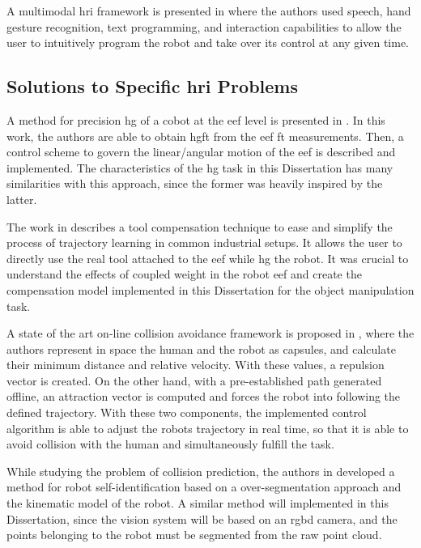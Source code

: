 \par A multimodal \ac{hri} framework is presented in \cite{colab.multimodal} where the authors used speech, hand gesture recognition, text programming, and interaction capabilities to allow the user to intuitively program the robot and take over its control at any given time. 

\subsection{Solutions to Specific \acs{hri} Problems}

\par A method for precision \ac{hg} of a cobot at the \ac{eef} level is presented in \cite{spec.handguide}. In this work, the authors are able to obtain \ac{hgft} from the \ac{eef} \ac{ft} measurements. Then, a control scheme to govern the linear/angular motion of the \ac{eef} is described and implemented. The characteristics of the \ac{hg} task in this Dissertation has many similarities with this approach, since the former was heavily inspired by the latter.

\par The work in \cite{spec.compensation} describes a tool compensation technique to ease and simplify the process of trajectory learning in common industrial setups. It allows the user to directly use the real tool attached to the \ac{eef} while \ac{hg} the robot. It was crucial to understand the effects of coupled weight in the robot \ac{eef} and create the compensation model implemented in this Dissertation for the object manipulation task.

\par A state of the art on-line collision avoidance framework is proposed in \cite{spec.collision}, where the authors represent in space the human and the robot as capsules, and calculate their minimum distance and relative velocity. With these values, a repulsion vector is created. On the other hand, with a pre-established path generated offline, an attraction vector is computed and forces the robot into following the defined trajectory. With these two components, the implemented control algorithm is able to adjust the robots trajectory in real time, so that it is able to avoid collision with the human and simultaneously fulfill the task.

\par While studying the problem of collision prediction, the authors in \cite{spec.selfidentification} developed a method for robot self-identification based on a over-segmentation approach and the kinematic model of the robot. A similar method will implemented in this Dissertation, since the vision system will be based on an \acs{rgbd} camera, and the points belonging to the robot must be segmented from the raw point cloud.

